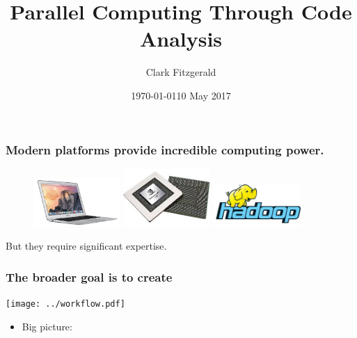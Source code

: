 \documentclass{beamer}
\begin{document}
\title{Parallel Computing Through Code Analysis}
\date{\today}
\date{10 May 2017}
\author{Clark Fitzgerald}

\frame{\titlepage}


\begin{frame}

\frametitle{Modern platforms provide incredible computing power.}


\begin{figure}
            \hfill
            \includegraphics[width=1.3in]{macbook.jpg}
            \hfill
            \includegraphics[width=1.3in]{gpu.jpg}
            \hfill
            \includegraphics[width=1.3in]{hadoop.png}
            \hfill
\end{figure}

\pause 

But they require significant expertise.

\end{frame}
\begin{frame}

    \frametitle{The broader goal is to create}

\centerline{\texttt{[image: ../workflow.pdf]}}

\pause 

    \begin{itemize}
        \item Big picture:
    \end{itemize}


\end{frame}
\end{document}
